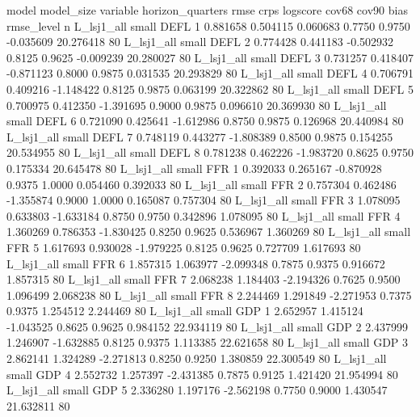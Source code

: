         model model_size variable  horizon_quarters     rmse     crps  logscore  cov68  cov90      bias  rmse_level  n
   L_lsj1_all      small     DEFL                 1 0.881658 0.504115  0.060683 0.7750 0.9750 -0.035609   20.276418 80
   L_lsj1_all      small     DEFL                 2 0.774428 0.441183 -0.502932 0.8125 0.9625 -0.009239   20.280027 80
   L_lsj1_all      small     DEFL                 3 0.731257 0.418407 -0.871123 0.8000 0.9875  0.031535   20.293829 80
   L_lsj1_all      small     DEFL                 4 0.706791 0.409216 -1.148422 0.8125 0.9875  0.063199   20.322862 80
   L_lsj1_all      small     DEFL                 5 0.700975 0.412350 -1.391695 0.9000 0.9875  0.096610   20.369930 80
   L_lsj1_all      small     DEFL                 6 0.721090 0.425641 -1.612986 0.8750 0.9875  0.126968   20.440984 80
   L_lsj1_all      small     DEFL                 7 0.748119 0.443277 -1.808389 0.8500 0.9875  0.154255   20.534955 80
   L_lsj1_all      small     DEFL                 8 0.781238 0.462226 -1.983720 0.8625 0.9750  0.175334   20.645478 80
   L_lsj1_all      small      FFR                 1 0.392033 0.265167 -0.870928 0.9375 1.0000  0.054460    0.392033 80
   L_lsj1_all      small      FFR                 2 0.757304 0.462486 -1.355874 0.9000 1.0000  0.165087    0.757304 80
   L_lsj1_all      small      FFR                 3 1.078095 0.633803 -1.633184 0.8750 0.9750  0.342896    1.078095 80
   L_lsj1_all      small      FFR                 4 1.360269 0.786353 -1.830425 0.8250 0.9625  0.536967    1.360269 80
   L_lsj1_all      small      FFR                 5 1.617693 0.930028 -1.979225 0.8125 0.9625  0.727709    1.617693 80
   L_lsj1_all      small      FFR                 6 1.857315 1.063977 -2.099348 0.7875 0.9375  0.916672    1.857315 80
   L_lsj1_all      small      FFR                 7 2.068238 1.184403 -2.194326 0.7625 0.9500  1.096499    2.068238 80
   L_lsj1_all      small      FFR                 8 2.244469 1.291849 -2.271953 0.7375 0.9375  1.254512    2.244469 80
   L_lsj1_all      small      GDP                 1 2.652957 1.415124 -1.043525 0.8625 0.9625  0.984152   22.934119 80
   L_lsj1_all      small      GDP                 2 2.437999 1.246907 -1.632885 0.8125 0.9375  1.113385   22.621658 80
   L_lsj1_all      small      GDP                 3 2.862141 1.324289 -2.271813 0.8250 0.9250  1.380859   22.300549 80
   L_lsj1_all      small      GDP                 4 2.552732 1.257397 -2.431385 0.7875 0.9125  1.421420   21.954994 80
   L_lsj1_all      small      GDP                 5 2.336280 1.197176 -2.562198 0.7750 0.9000  1.430547   21.632811 80
